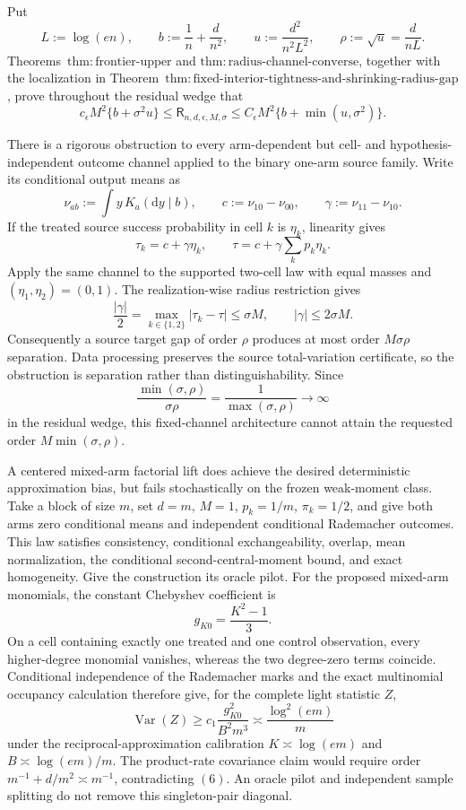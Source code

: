 Put
\[
 L:=\log(en),\qquad b:=\frac1n+\frac d{n^2},\qquad
 u:=\frac{d^2}{n^2L^2},\qquad \rho:=\sqrt u=\frac d{nL}.
\]
Theorems~\(\mathrm{thm:frontier\text{-}upper}\) and
\(\mathrm{thm:radius\text{-}channel\text{-}converse}\), together with the
localization in Theorem~\(\mathrm{thm:fixed\text{-}interior\text{-}tightness\text{-}and\text{-}shrinking\text{-}radius\text{-}gap}\), prove throughout the residual wedge that
\[
 c_{\epsilon}M^2\{b+\sigma^2u\}
 \le \mathsf R_{n,d,\epsilon,M,\sigma}
 \le C_{\epsilon}M^2\{b+\min(u,\sigma^2)\}.
\tag{1}
\]

There is a rigorous obstruction to every arm-dependent but cell- and
hypothesis-independent outcome channel applied to the binary one-arm source
family.  Write its conditional output means as
\[
 \nu_{ab}:=\int y\,K_a(\mathrm dy\mid b),\qquad
 c:=\nu_{10}-\nu_{00},\qquad \gamma:=\nu_{11}-\nu_{10}.
\]
If the treated source success probability in cell \(k\) is \(\eta_k\),
linearity gives
\[
 \tau_k=c+\gamma\eta_k,
 \qquad
 \tau=c+\gamma\sum_kp_k\eta_k.
\tag{2}
\]
Apply the same channel to the supported two-cell law with equal masses and
\((\eta_1,\eta_2)=(0,1)\).  The realization-wise radius restriction gives
\[
 \frac{|\gamma|}{2}
 =\max_{k\in\{1,2\}}|\tau_k-\tau|
 \le\sigma M,
 \qquad |\gamma|\le2\sigma M.
\tag{3}
\]
Consequently a source target gap of order \(\rho\) produces at most order
\(M\sigma\rho\) separation.  Data processing preserves the source
total-variation certificate, so the obstruction is separation rather than
distinguishability.  Since
\[
 \frac{\min(\sigma,\rho)}{\sigma\rho}
 =\frac1{\max(\sigma,\rho)}\longrightarrow\infty
\tag{4}
\]
in the residual wedge, this fixed-channel architecture cannot attain the
requested order \(M\min(\sigma,\rho)\).

A centered mixed-arm factorial lift does achieve the desired deterministic
approximation bias, but fails stochastically on the frozen weak-moment class.
Take a block of size \(m\), set \(d=m\), \(M=1\), \(p_k=1/m\),
\(\pi_k=1/2\), and give both arms zero conditional means and independent
conditional Rademacher outcomes.  This law satisfies consistency,
conditional exchangeability, overlap, mean normalization, the conditional
second-central-moment bound, and exact homogeneity.  Give the construction
its oracle pilot.  For the proposed mixed-arm monomials, the constant
Chebyshev coefficient is
\[
 g_{K0}=\frac{K^2-1}{3}.
\tag{5}
\]
On a cell containing exactly one treated and one control observation, every
higher-degree monomial vanishes, whereas the two degree-zero terms coincide.
Conditional independence of the Rademacher marks and the exact multinomial
occupancy calculation therefore give, for the complete light statistic
\(Z\),
\[
 \operatorname{Var}(Z)
 \ge c_1\frac{g_{K0}^2}{B^2m^3}
 \asymp\frac{\log^2(em)}m
\tag{6}
\]
under the reciprocal-approximation calibration
\(K\asymp\log(em)\) and \(B\asymp\log(em)/m\).  The product-rate covariance
claim would require order \(m^{-1}+d/m^2\asymp m^{-1}\), contradicting
\((6)\).  An oracle pilot and independent sample splitting do not remove
this singleton-pair diagonal.

